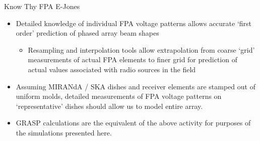 \documentclass[pdf,azure,slideColor,colorBG]{prosper}
\begin{document}
\begin{slide}{Know Thy FPA E-Jones}
\begin{small}
\begin{itemize}
\item Detailed knowledge of individual FPA voltage patterns allows
accurate `first order' prediction of phased array beam shapes
\begin{itemize}
\item Resampling and interpolation tools allow extrapolation from 
coarse `grid' measurements of actual FPA elements to finer grid for 
prediction of actual values associated with radio sources in the field
\end{itemize}
\item Assuming MIRANdA / SKA dishes and receiver elements are stamped out of 
uniform molds, detailed measurements of FPA voltage patterns on 
`representative' dishes should allow us to model entire array.
\item GRASP calculations are the equivalent of the above activity for
purposes of the simulations presented here.
\end{itemize}
\end {small}
\end{slide}
\end{document}
